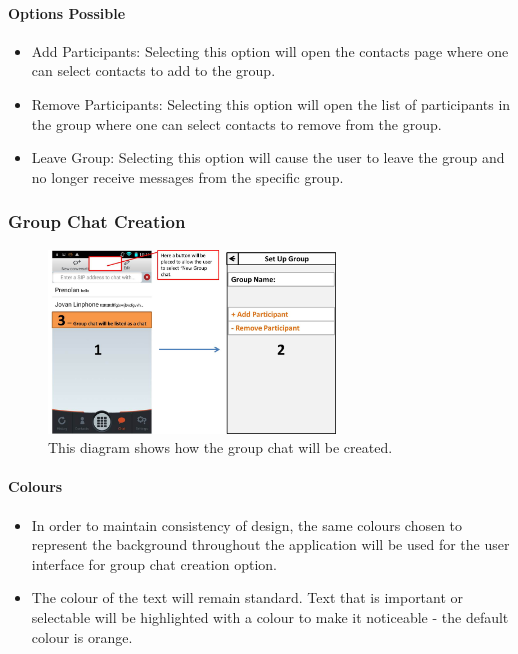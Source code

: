 \documentclass[11pt]{article}
\begin{document}
\paragraph{Options Possible}
\begin{itemize}
\item	Add Participants: Selecting this option will open the contacts page where one can select contacts to add to the group.
\item 	Remove Participants: Selecting this option will open the list of participants in the group where one can select contacts to remove from the group.
\item Leave Group: Selecting this option will cause the user to leave the group and no longer receive messages from the specific group.\\
\end{itemize}



\subsubsection{Group Chat Creation}
\begin{figure}[H]
\centering
\includegraphics[width=3in]{./images/CG.jpg}
\caption[Create Group Chat]{This diagram shows how the group chat will be created.}
\label{cd-cg}
\end{figure}

\paragraph{Colours}
\begin{itemize}
\item	In order to maintain consistency of design, the same colours chosen to represent the background throughout the application will be used for the user interface for group chat creation option.
\item	The colour of the text will remain standard. Text that is important or selectable will be highlighted with a colour to make it noticeable - the default colour is orange. 	\\
\end{itemize}
\end{document}
